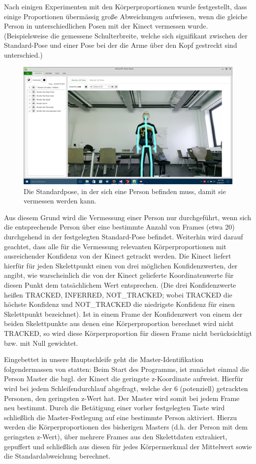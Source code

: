 Nach einigen Experimenten mit den Körperproportionen wurde festgestellt, dass einige Proportionen übermässig große Abweichungen aufwiesen, wenn die gleiche Person in unterschiedlichen Posen mit der Kinect vermessen wurde. (Beispielsweise die gemessene Schulterbreite, welche sich signifikant zwischen der Standard-Pose und einer Pose bei der die Arme über den Kopf gestreckt sind unterschied.) 
\begin{figure}[h!]
		\centering
		\includegraphics[width=.8\textwidth]{pictures/standardpose_.png}
		\caption{Die Standardpose, in der sich eine Person befinden muss, damit sie vermessen werden kann.}\label{fig:standardp}
		\end{figure}
Aus diesem Grund wird die Vermessung einer Person nur durchgeführt, wenn sich die entsprechende Person über eine bestimmte Anzahl von Frames (etwa 20) durchgehend in der festgelegten Standard-Pose befindet. Weiterhin wird darauf geachtet, dass alle für die Vermessung relevanten Körperproportionen mit ausreichender Konfidenz von der Kinect getrackt werden. Die Kinect liefert hierfür für jeden Skelettpunkt einen von drei möglichen Konfidenzwerten, der angibt, wie warscheinlich die von der Kinect gelieferte Koordinatenwerte für diesen Punkt dem tatsächlichem Wert entsprechen. (Die drei Konfidenzwerte heißen TRACKED, INFERRED, NOT\_TRACKED; wobei TRACKED die höchste Konfidenz und NOT\_TRACKED die niedrigste Konfidenz für einen Skelettpunkt bezeichnet). Ist in einem Frame der Konfidenzwert von einem der beiden Skelettpunkte aus denen eine Körperproportion berechnet wird nicht TRACKED, so wird diese Körperproportion für diesen Frame nicht berücksichtigt bzw. mit Null gewichtet. \par
Eingebettet in unsere Hauptschleife geht die Master-Identifikation folgendermassen von statten: Beim Start des Programms, ist zunächst einmal die Person Master die bzgl. der Kinect die geringste z-Koordinate aufweist. Hierfür wird bei jedem Schleifendurchlauf abgefragt, welche der 6 (potenziell) getrackten Personen, den geringsten z-Wert hat. Der Master wird somit bei jedem Frame neu bestimmt. Durch die Betätigung einer vorher festgelegten Taste wird schließlich die Master-Festlegung auf eine bestimmte Person aktiviert. Hierzu werden die Körperproportionen des bisherigen Masters (d.h. der Person mit dem geringsten z-Wert), über mehrere Frames aus den Skelettdaten extrahiert, gepuffert und schließlich aus diesen für jedes Körpermerkmal der Mittelwert sowie die Standardabweichung berechnet.
	
	
	
